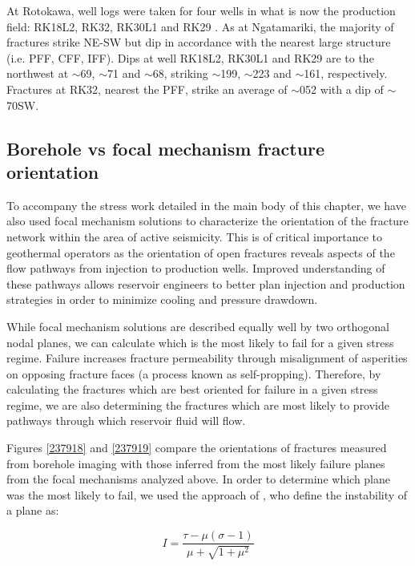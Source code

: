 At Rotokawa, well logs were taken for four wells in what is now the production field: RK18L2, RK32, RK30L1 and RK29 \citep{massiot_rk18l2,massiot_rk32,mcnamara2011rk29,mcnamara2010rk30l1}. As at Ngatamariki, the majority of fractures strike NE-SW but dip in accordance with the nearest large structure (i.e. \acrshort{PFF}, \acrshort{CFF}, \acrshort{IFF}). Dips at well RK18L2, RK30L1 and RK29 are to the northwest at $\sim$69\textdegree{}, $\sim$71\textdegree{} and $\sim$68\textdegree{}, striking $\sim$199\textdegree{}, $\sim$223\textdegree{} and $\sim$161\textdegree{}, respectively. Fractures at RK32, nearest the \acrlong{PFF}, strike an average of $\sim$052\textdegree{} with a dip of $\sim$70\textdegree{}SW.

\subsection{Borehole vs focal mechanism fracture orientation}
To accompany the stress work detailed in the main body of this chapter, we have also used focal mechanism solutions to characterize the orientation of the fracture network within the area of active seismicity. This is of critical importance to geothermal operators as the orientation of open fractures reveals aspects of the flow pathways from injection to production wells. Improved understanding of these pathways allows reservoir engineers to better plan injection and production strategies in order to minimize cooling and pressure drawdown.

While focal mechanism solutions are described equally well by two orthogonal nodal planes, we can calculate which is the most likely to fail for a given stress regime. Failure increases fracture \gls{permeability} through misalignment of asperities on opposing fracture faces (a process known as self-propping). Therefore, by calculating the fractures which are best oriented for failure in a given stress regime, we are also determining the fractures which are most likely to provide pathways through which reservoir fluid will flow.

Figures \ref{237918} and \ref{237919} compare the orientations of fractures measured from borehole imaging with those inferred from the most likely failure planes from the focal mechanisms analyzed above. In order to determine which plane was the most likely to fail, we used the approach of \citet{vavryvcuk2014iterative}, who define the instability of a plane as:

\begin{equation}
I = \frac{\tau - \mu(\sigma - 1)}{\mu + \sqrt{1 + \mu^{2}}}
\end{equation}

